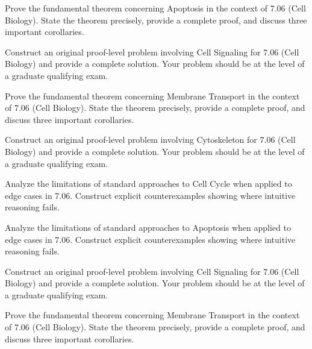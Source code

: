 \documentclass[12pt,a4paper]{exam}
\begin{document}
\begin{questions}
\vspace{0.3cm}

\question[4]
Prove the fundamental theorem concerning Apoptosis in the context of 7.06 (Cell Biology). State the theorem precisely, provide a complete proof, and discuss three important corollaries.

\vspace{0.3cm}

\question[4]
Construct an original proof-level problem involving Cell Signaling for 7.06 (Cell Biology) and provide a complete solution. Your problem should be at the level of a graduate qualifying exam.

\vspace{0.3cm}

\question[2]
Prove the fundamental theorem concerning Membrane Transport in the context of 7.06 (Cell Biology). State the theorem precisely, provide a complete proof, and discuss three important corollaries.

\vspace{0.3cm}

\question[4]
Construct an original proof-level problem involving Cytoskeleton for 7.06 (Cell Biology) and provide a complete solution. Your problem should be at the level of a graduate qualifying exam.

\vspace{0.3cm}

\question[5]
Analyze the limitations of standard approaches to Cell Cycle when applied to edge cases in 7.06. Construct explicit counterexamples showing where intuitive reasoning fails.

\vspace{0.3cm}

\question[2]
Analyze the limitations of standard approaches to Apoptosis when applied to edge cases in 7.06. Construct explicit counterexamples showing where intuitive reasoning fails.

\vspace{0.3cm}

\question[2]
Construct an original proof-level problem involving Cell Signaling for 7.06 (Cell Biology) and provide a complete solution. Your problem should be at the level of a graduate qualifying exam.

\vspace{0.3cm}

\question[3]
Prove the fundamental theorem concerning Membrane Transport in the context of 7.06 (Cell Biology). State the theorem precisely, provide a complete proof, and discuss three important corollaries.


\end{questions}
\end{document}
